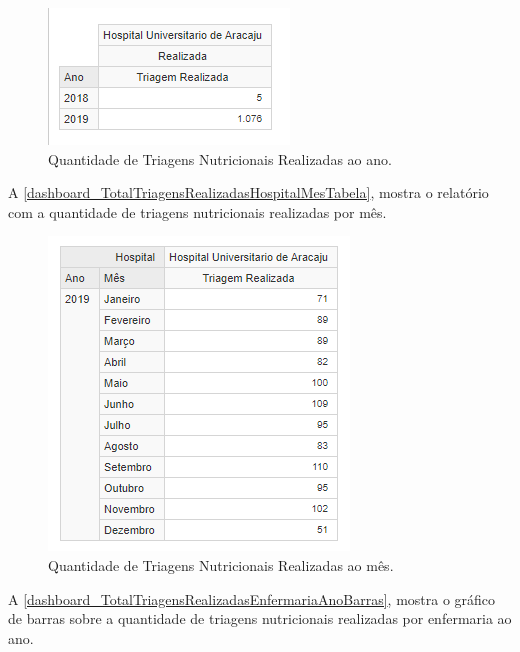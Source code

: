 \begin{figure}[htb]
	\caption{\label{dashboard_TotalTriagensRealizadasHospitalAnoTabela}Quantidade de Triagens Nutricionais Realizadas ao ano.}
	\begin{center}
	    \includegraphics[scale=1]{Imagens/1.1.TotalTriagensRealizadasHospitalAnoTabela.png}
	\end{center}
\end{figure}

A \autoref{dashboard_TotalTriagensRealizadasHospitalMesTabela}, mostra o relatório com a quantidade de triagens nutricionais realizadas por mês. 

\begin{figure}[htb]
	\caption{\label{dashboard_TotalTriagensRealizadasHospitalMesTabela}Quantidade de Triagens Nutricionais Realizadas ao mês.}
	\begin{center}
	    \includegraphics[scale=1]{Imagens/1.2.TotalTriagensRealizadasHospitalMesTabela.png}
	\end{center}
\end{figure}

A \autoref{dashboard_TotalTriagensRealizadasEnfermariaAnoBarras}, mostra o gráfico de barras sobre a quantidade de triagens nutricionais realizadas por enfermaria ao ano.

